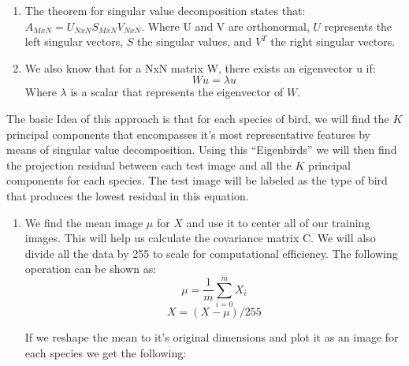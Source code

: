 \documentclass[11pt]{article}
\begin{document}
\begin{singlespace}
\begin{enumerate}
\item The theorem for singular value decomposition states that: $ A_{MxN} = U_{NxN}S_{MxN}V_{NxN}$. Where U and V are orthonormal, $U$ represents the left singular vectors, $S$ the singular values, and $V^T$ the right singular vectors.
\item We also know that for a NxN matrix W, there exists an eigenvector u if:
$$ Wu = \lambda u $$ 
Where $\lambda$ is a scalar that represents the eigenvector of $W$. 
\end{enumerate}

The basic Idea of this approach is that for each species of bird, we will find the $K$ principal components that encompasses it's most representative features by means of singular value decomposition. Using this ``Eigenbirds'' we will then find the projection residual between each test image and all the $K$ principal components for each species. The test image will be labeled as the type of bird that produces the lowest residual in this equation. 

\begin{enumerate}
\item We find the mean image $\mu$ for $X$ and use it to center all of our training images. This will help us calculate the covariance matrix C. We will also divide all the data by 255 to scale for computational efficiency. The following operation can be shown as:
$$ \mu = \frac{1}{m}\sum_{i=0}^{m}X_i $$
$$ X = (X-\mu)/255 $$

If we reshape the mean to it's original dimensions and plot it as an image for each species we get the following:

\begin{figure}[h]
    \centering
    

\end{figure}
\end{enumerate}
\end{singlespace}
\end{document}
